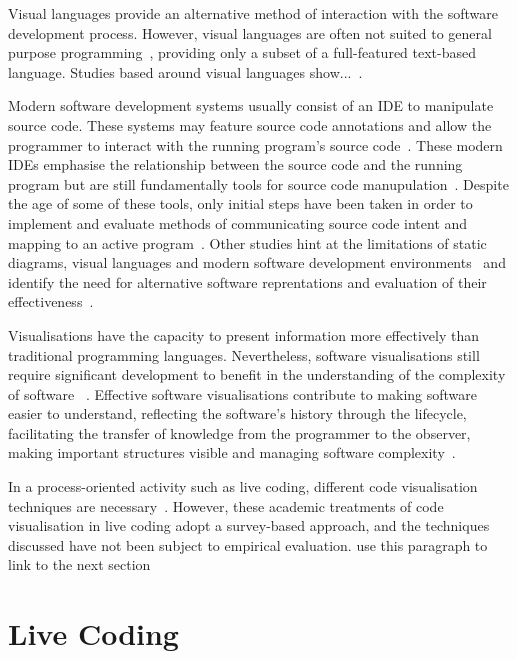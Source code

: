Visual languages provide an alternative method of interaction with the software development process. However, visual languages are often not suited to general purpose programming~\cite{Myers1989}, providing only a subset of a full-featured text-based language. Studies based around visual languages show...~.

Modern software development systems usually consist of an \ac{IDE} to manipulate source code. These systems may feature source code annotations and allow the programmer to interact with the running program's source code~. These modern \acp{IDE} emphasise the relationship between the source code and the running program but are still fundamentally tools for source code manupulation~. Despite the age of some of these tools, only initial steps have been taken in order to implement and evaluate methods of communicating source code intent and mapping to an active program~. Other studies hint at the limitations of static diagrams, visual languages and modern software development environments~ and identify the need for alternative software reprentations and evaluation of their effectiveness~. 

Visualisations have the capacity to present information more effectively than traditional programming languages. Nevertheless, software visualisations still require significant development to benefit in the understanding of the complexity of software ~\cite{Baecker1995}. Effective software visualisations contribute to making software easier to understand, reflecting the software's history through the lifecycle, facilitating the transfer of knowledge from the programmer to the observer, making important structures visible and managing software complexity~\cite{Baecker1995}.


In a process-oriented activity such as live coding, different code visualisation techniques are necessary~\cite{McLean2010a,Magnusson2013}. However, these academic treatments of code visualisation in live coding adopt a survey-based approach, and the techniques discussed have not been subject to empirical evaluation. {\color{red} use this paragraph to link to the next section}

\section{Live Coding}

